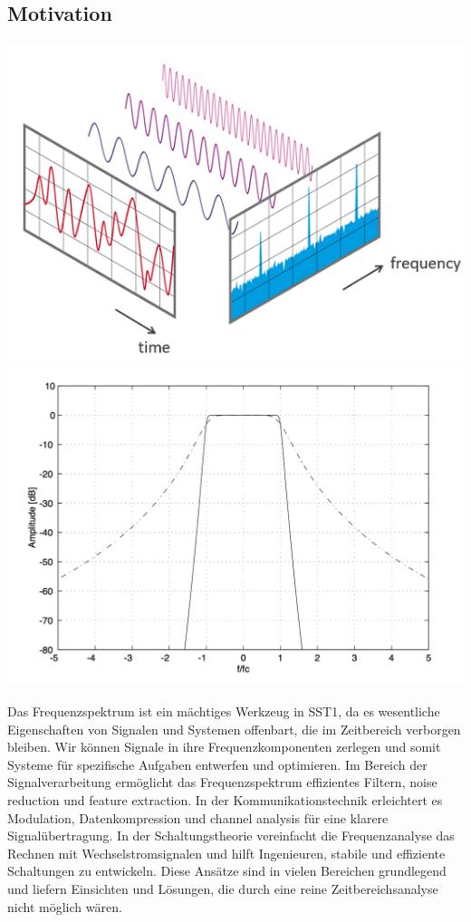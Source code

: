 \documentclass[11pt]{article}
\begin{document}
\subsection*{Motivation}
\vspace*{-0.75cm}
\begin{center}
    \includegraphics[width=0.35\linewidth]{docimgs/Zeit_und_Frequenzbereich.png}
    \includegraphics[width=0.3\linewidth]{docimgs/Butterworth_filter.png}
\end{center}
\vspace*{-0.5cm}
Das Frequenzspektrum ist ein mächtiges Werkzeug in SST1, da es wesentliche Eigenschaften von Signalen und Systemen offenbart, die im Zeitbereich verborgen bleiben. Wir können Signale in ihre Frequenzkomponenten zerlegen und somit Systeme für spezifische Aufgaben entwerfen und optimieren. Im Bereich der Signalverarbeitung ermöglicht das Frequenzspektrum effizientes Filtern, noise reduction und feature extraction. In der Kommunikationstechnik erleichtert es Modulation, Datenkompression und channel analysis für eine klarere Signalübertragung. In der Schaltungstheorie vereinfacht die Frequenzanalyse das Rechnen mit Wechselstromsignalen und hilft Ingenieuren, stabile und effiziente Schaltungen zu entwickeln. Diese Ansätze sind in vielen Bereichen grundlegend und liefern Einsichten und Lösungen, die durch eine reine Zeitbereichsanalyse nicht möglich wären.

\vspace*{-0.5cm}
\end{document}
